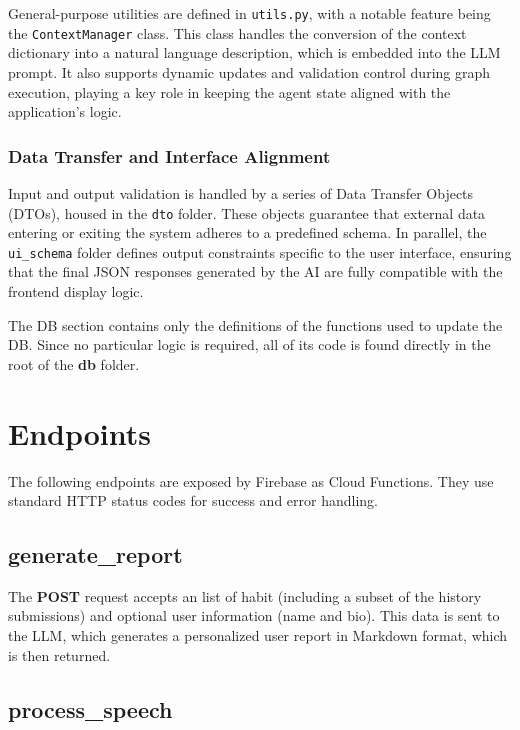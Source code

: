 \documentclass{article}
\newcommand{\newpar}[0]{\vspace{2mm}\noindent}
\begin{document}
General-purpose utilities are defined in \texttt{utils.py}, with a notable feature being the \texttt{ContextManager} class. This class handles the conversion of the context dictionary into a natural language description, which is embedded into the LLM prompt. It also supports dynamic updates and validation control during graph execution, playing a key role in keeping the agent state aligned with the application's logic.

\subsubsection{Data Transfer and Interface Alignment}

Input and output validation is handled by a series of Data Transfer Objects (DTOs), housed in the \texttt{dto} folder. These objects guarantee that external data entering or exiting the system adheres to a predefined schema. In parallel, the \texttt{ui\_schema} folder defines output constraints specific to the user interface, ensuring that the final JSON responses generated by the AI are fully compatible with the frontend display logic.


\newpar
The DB section contains only the definitions of the functions used to update the DB.
Since no particular logic is required, all of its code is found directly in the root of the \textbf{db} folder.

\section{Endpoints}

The following endpoints are exposed by Firebase as Cloud Functions.
They use standard HTTP status codes for success and error handling.

\subsection{generate\_report}

The \textbf{POST} request accepts an list of habit (including a subset of the history submissions) and optional user information (name and bio).
This data is sent to the LLM, which generates a personalized user report in Markdown format, which is then returned.

\subsection{process\_speech}
\end{document}
